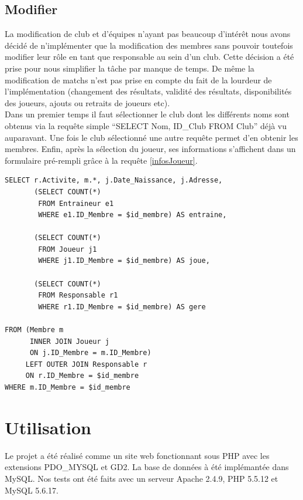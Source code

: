 \documentclass[a4paper,8pt,french,fleqn]{report}
\begin{document}
\section{Modifier}

La modification de club et d'équipes n'ayant pas beaucoup d'intérêt nous avons décidé de n'implémenter que la modification des membres sans pouvoir toutefois modifier leur rôle en tant que responsable au sein d'un club. Cette décision a été prise pour nous simplifier la tâche par manque de temps. De même la modification de matchs n'est pas prise en compte du fait de la lourdeur de l'implémentation (changement des résultats, validité des résultats, disponibilités des joueurs, ajouts ou retraits de joueurs etc). \\

Dans un premier temps il faut sélectionner le club dont les différents noms sont obtenus via la requête simple ``SELECT Nom, ID\_Club FROM Club'' déjà vu auparavant. Une fois le club sélectionné une autre requête permet d'en obtenir les membres. Enfin, après la sélection du joueur, ses informations s'affichent dans un formulaire pré-rempli grâce à la requête \ref{infosJoueur}.

\begin{lstlisting}
SELECT r.Activite, m.*, j.Date_Naissance, j.Adresse,
       (SELECT COUNT(*) 
        FROM Entraineur e1
        WHERE e1.ID_Membre = $id_membre) AS entraine,

       (SELECT COUNT(*)
        FROM Joueur j1
        WHERE j1.ID_Membre = $id_membre) AS joue,

       (SELECT COUNT(*)
        FROM Responsable r1
        WHERE r1.ID_Membre = $id_membre) AS gere

FROM (Membre m 
      INNER JOIN Joueur j
      ON j.ID_Membre = m.ID_Membre)
     LEFT OUTER JOIN Responsable r
     ON r.ID_Membre = $id_membre
WHERE m.ID_Membre = $id_membre
\end{lstlisting}  

\chapter{Utilisation}

Le projet a été réalisé comme un site web fonctionnant sous PHP avec les extensions PDO\_MYSQL et GD2. La base de données à été implémantée dans MySQL. Nos tests ont été faits avec un serveur Apache 2.4.9, PHP 5.5.12 et MySQL 5.6.17. \\
\end{document}
